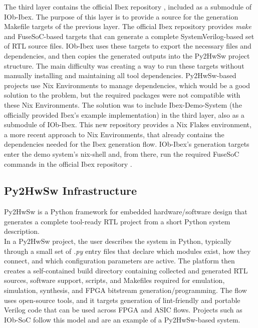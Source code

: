 The third layer contains the official Ibex repository \cite{ibex}, included as a submodule of IOb-Ibex. The purpose of this layer is to provide a source for the generation Makefile targets of the previous layer. The official Ibex repository provides \textit{make} and FuseSoC-based targets that can generate a complete SystemVerilog-based set of \ac{RTL} source files. IOb-Ibex uses these targets to export the necessary files and dependencies, and then copies the generated outputs into the Py2HwSw project structure. The main difficulty was creating a way to run these targets without manually installing and maintaining all tool dependencies. Py2HwSw-based projects use Nix Environments to manage dependencies, which would be a good solution to the problem, but the required packages were not compatible with these Nix Environments. The solution was to include Ibex-Demo-System \cite{ibex-demo-system} (the officially provided Ibex's example implementation) in the third layer, also as a submodule of IOb-Ibex. This new repository provides a Nix Flakes environment, a more recent approach to Nix Environments, that already contains the dependencies needed for the Ibex generation flow. IOb-Ibex's generation targets enter the demo system's \cite{ibex-demo-system} nix-shell and, from there, run the required FuseSoC commands in the official Ibex repository \cite{ibex}.



\subsection{Py2HwSw Infrastructure}
\label{chap5:py2hwsw}

Py2HwSw \cite{py2hwsw} is a Python framework for embedded hardware/software design that generates a complete tool-ready \ac{RTL} project from a short Python system description.\\
In a Py2HwSw project, the user describes the system in Python, typically through a small set of \textit{.py} entry files that declare which modules exist, how they connect, and which configuration parameters are active. The platform then creates a self-contained build directory containing collected and generated \ac{RTL} sources, software support, scripts, and Makefiles required for emulation, simulation, synthesis, and \ac{FPGA} bitstream generation/programming. The flow uses open-source tools, and it targets generation of lint-friendly and portable Verilog code that can be used across FPGA and ASIC flows. Projects such as IOb-SoC \cite{iob-soc} follow this model and are an example of a Py2HwSw-based system.


